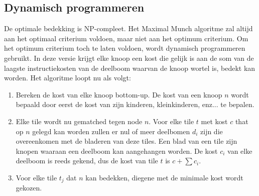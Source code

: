 \subsection{Dynamisch programmeren}
De optimale bedekking is NP-compleet. Het Maximal Munch algoritme zal altijd aan het optimaal criterium voldoen, maar niet aan het optimum criterium. Om het optimum criterium toch te laten voldoen, wordt dynamisch programmeren gebruikt. In deze versie krijgt elke knoop een kost die gelijk is aan de som van de laagste instructiekosten van de deelboom waarvan de knoop wortel is, bedekt kan worden. Het algoritme loopt nu als volgt:
\begin{enumerate}
	\item Bereken de kost van elke knoop bottom-up. De kost van een knoop $n$ wordt bepaald door eerst de kost van zijn kinderen, kleinkinderen, enz... te bepalen. 
	\item Elke tile wordt nu gematched tegen node $n$. Voor elke tile $t$ met kost $c$ that op $n$ gelegd kan worden zullen er nul of meer deelbomen $d_i$ zijn die overeenkomen met de bladeren van deze tiles. Een blad van een tile zijn knopen waaraan een deelboom kan aangehangen worden. De kost $c_i$ van elke deelboom is reeds gekend, dus de kost van tile $t$ is $c + \sum c_i$.
	\item Voor elke tile $t_j$ dat $n$ kan bedekken, diegene met de minimale kost wordt gekozen.
\end{enumerate}

